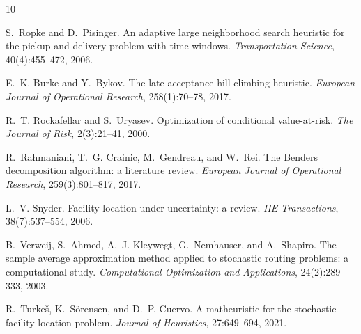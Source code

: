 \documentclass[11pt,a4paper]{article}
\begin{document}
\newpage


\begin{thebibliography}{10}

S.~Ropke and D.~Pisinger.
\newblock An adaptive large neighborhood search heuristic for the pickup and delivery problem with time windows.
\newblock \emph{Transportation Science}, 40(4):455--472, 2006.

E.~K. Burke and Y.~Bykov.
\newblock The late acceptance hill-climbing heuristic.
\newblock \emph{European Journal of Operational Research}, 258(1):70--78, 2017.

R.~T. Rockafellar and S.~Uryasev.
\newblock Optimization of conditional value-at-risk.
\newblock \emph{The Journal of Risk}, 2(3):21--41, 2000.

R.~Rahmaniani, T.~G. Crainic, M.~Gendreau, and W.~Rei.
\newblock The {B}enders decomposition algorithm: a literature review.
\newblock \emph{European Journal of Operational Research}, 259(3):801--817, 2017.

L.~V. Snyder.
\newblock Facility location under uncertainty: a review.
\newblock \emph{IIE Transactions}, 38(7):537--554, 2006.

B.~Verweij, S.~Ahmed, A.~J. Kleywegt, G.~Nemhauser, and A.~Shapiro.
\newblock The sample average approximation method applied to stochastic routing problems: a computational study.
\newblock \emph{Computational Optimization and Applications}, 24(2):289--333, 2003.

R.~Turke\v{s}, K.~S\"orensen, and D.~P. Cuervo.
\newblock A matheuristic for the stochastic facility location problem.
\newblock \emph{Journal of Heuristics}, 27:649--694, 2021.

\end{thebibliography}
\end{document}
